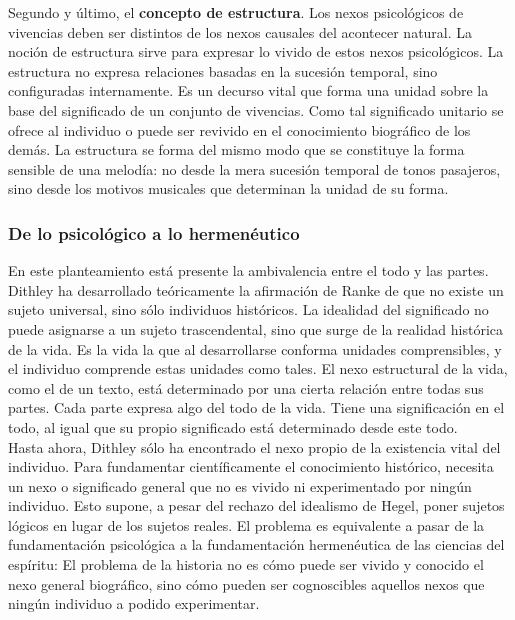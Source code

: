 \documentclass[a4paper, 11pt, twocolumn, spanish]{article}
\begin{document}
Segundo y último, el \textbf{concepto de estructura}. Los nexos psicológicos
de vivencias deben ser distintos de los nexos causales del acontecer
natural. La noción de estructura sirve para expresar lo vivido de
estos nexos psicológicos. La estructura no expresa relaciones basadas
en la sucesión temporal, sino configuradas internamente. Es un decurso
vital que forma una unidad sobre la base del significado de un
conjunto de vivencias. Como tal significado unitario se ofrece al
individuo o puede ser revivido en el conocimiento biográfico de los
demás. La estructura se forma del mismo modo que se constituye la
forma sensible de una melodía: no desde la mera sucesión temporal de
tonos pasajeros, sino desde los motivos musicales que determinan la
unidad de su forma.\\[0pt]

\subsubsection{De lo psicológico a lo hermenéutico}
\label{sec:org24ea16d}

En este planteamiento está presente la ambivalencia entre el todo y
las partes. Dithley ha desarrollado teóricamente la afirmación de
Ranke de que no existe un sujeto universal, sino sólo individuos
históricos. La idealidad del significado no puede asignarse a un
sujeto trascendental, sino que surge de la realidad histórica de la
vida. Es la vida la que al desarrollarse conforma unidades
comprensibles, y el individuo comprende estas unidades como tales. El
nexo estructural de la vida, como el de un texto, está determinado por
una cierta relación entre todas sus partes. Cada parte expresa algo
del todo de la vida. Tiene una significación en el todo, al igual que
su propio significado está determinado desde este todo.\\[0pt]

Hasta ahora, Dithley sólo ha encontrado el nexo propio de la
existencia vital del individuo. Para fundamentar científicamente el
conocimiento histórico, necesita un nexo o significado general que no
es vivido ni experimentado por ningún individuo. Esto supone, a pesar
del rechazo del idealismo de Hegel, poner sujetos lógicos en lugar de
los sujetos reales. El problema es equivalente a pasar de la
fundamentación psicológica a la fundamentación hermenéutica de las
ciencias del espíritu: El problema de la historia no es cómo puede ser
vivido y conocido el nexo general biográfico, sino cómo pueden ser
cognoscibles aquellos nexos que ningún individuo a podido experimentar.\\[0pt]
\end{document}
